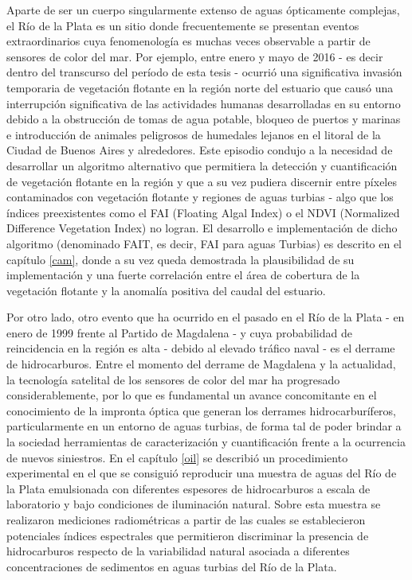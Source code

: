 Aparte de ser un cuerpo singularmente extenso de aguas ópticamente complejas, el Río de la Plata es un sitio donde frecuentemente se presentan eventos extraordinarios cuya fenomenología es muchas veces observable a partir de sensores de color del mar. Por ejemplo, entre enero y mayo de 2016 - es decir dentro del transcurso del período de esta tesis - ocurrió una significativa invasión temporaria de vegetación flotante en la región norte del estuario que causó una interrupción significativa de las actividades humanas desarrolladas en su entorno debido a la obstrucción de tomas de agua potable, bloqueo de puertos y marinas e introducción de animales peligrosos de humedales lejanos en el litoral de la Ciudad de Buenos Aires y alrededores. Este episodio condujo a la necesidad de desarrollar un algoritmo alternativo que permitiera la detección y cuantificación de vegetación flotante en la región y que a su vez pudiera discernir entre píxeles contaminados con vegetación flotante y regiones de aguas turbias - algo que los índices preexistentes como el FAI (Floating Algal Index) o el NDVI (Normalized Difference Vegetation Index) no logran. El desarrollo e implementación de dicho algoritmo (denominado FAIT, es decir, FAI para aguas Turbias) es descrito en el capítulo \ref{cam}, donde a su vez queda demostrada la plausibilidad de su implementación y una fuerte correlación entre el área de cobertura de la vegetación flotante y la anomalía positiva del caudal del estuario.

Por otro lado, otro evento que ha ocurrido en el pasado en el Río de la Plata - en enero de 1999 frente al Partido de Magdalena - y cuya probabilidad de reincidencia en la región es alta - debido al elevado tráfico naval - es el derrame de hidrocarburos. Entre el momento del derrame de Magdalena y la actualidad, la tecnología satelital de los sensores de color del mar ha progresado considerablemente, por lo que es fundamental un avance concomitante en el conocimiento de la impronta óptica que generan los derrames hidrocarburíferos, particularmente en un entorno de aguas turbias, de forma tal de poder brindar a la sociedad herramientas de caracterización y cuantificación frente a la ocurrencia de nuevos siniestros. En el capítulo \ref{oil} se describió un procedimiento experimental en el que se consiguió reproducir una muestra de aguas del Río de la Plata emulsionada con diferentes espesores de hidrocarburos a escala de laboratorio y bajo condiciones de iluminación natural. Sobre esta muestra se realizaron mediciones radiométricas a partir de las cuales se establecieron potenciales índices espectrales que permitieron discriminar la presencia de hidrocarburos respecto de la variabilidad natural asociada a diferentes concentraciones de sedimentos en aguas turbias del Río de la Plata.

